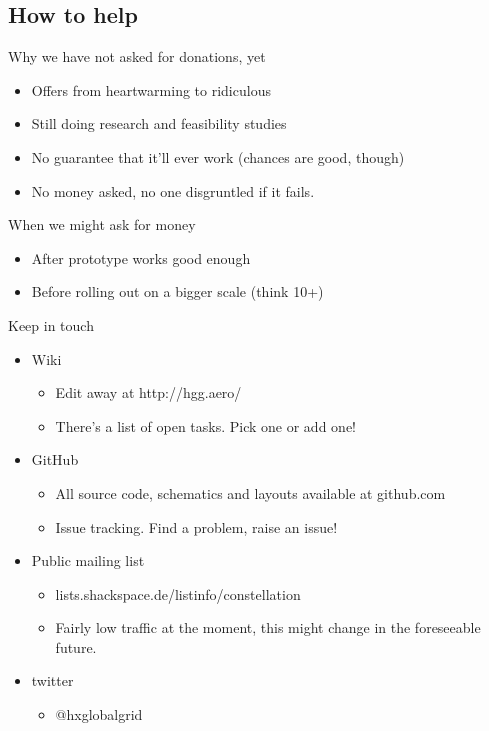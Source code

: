\subsection{How to help}
	\begin{frame}{Why we have not asked for donations, yet}
		\begin{itemize}
			\item Offers from heartwarming to ridiculous
			\item Still doing research and feasibility studies
			\item No guarantee that it'll ever work (chances are good, though)
			\item No money asked, no one disgruntled if it fails.
		\end{itemize}
	\end{frame}
	\begin{frame}{When we might ask for money}
		\begin{itemize}
			\item After prototype works good enough
			\item Before rolling out on a bigger scale (think 10+)
		\end{itemize}
	\end{frame}
	\begin{frame}{Keep in touch}
		\begin{itemize}
			\item Wiki
			\begin{itemize}
				\item Edit away at http://hgg.aero/
				\item There's a list of open tasks.  Pick one or add one!
			\end{itemize}

			\item GitHub
			\begin{itemize}
				\item All source code, schematics and layouts available at github.com
				\item Issue tracking.  Find a problem, raise an issue!
			\end{itemize}

			\item Public mailing list
			\begin{itemize}
				\item lists.shackspace.de/listinfo/constellation
				\item Fairly low traffic at the moment, this might change in the foreseeable future.
			\end{itemize}

			\item twitter
			\begin{itemize}
				\item @hxglobalgrid
			\end{itemize}
		\end{itemize}
	\end{frame}


